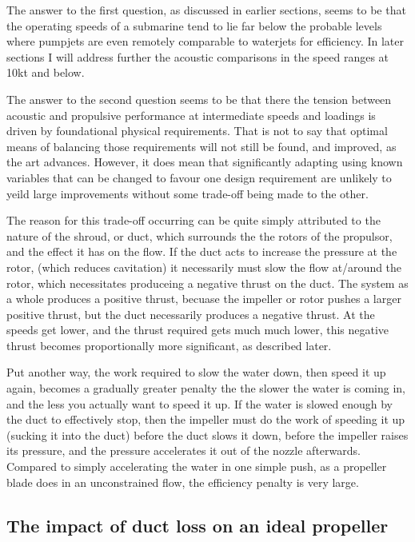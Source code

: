 \documentclass{article}\usepackage[]{graphicx}\usepackage[]{color}
\begin{document}
The answer to the first question, as discussed in earlier sections, seems to be that the operating speeds of a submarine tend to lie far below the probable levels where pumpjets are even remotely comparable to waterjets for efficiency.  In later sections I will address further the acoustic comparisons in the speed ranges at 10kt and below.

The answer to the second question seems to be that there the tension between acoustic and propulsive performance at intermediate speeds and loadings is driven by foundational physical requirements.  That is not to say that optimal means of balancing those requirements will not still be found, and improved, as the art advances.  However, it does mean that significantly adapting using known variables that can be changed to favour one design requirement are unlikely to yeild large improvements without some trade-off being made to the other.

The reason for this trade-off occurring can be quite simply attributed to the nature of the shroud, or duct, which surrounds the the rotors of the propulsor, and the effect it has on the flow. If the duct acts to increase the pressure at the rotor, (which reduces cavitation) it necessarily must slow the flow at/around the rotor, which necessitates produceing a negative thrust on the duct.  The system as a whole produces a positive thrust, becuase the impeller or rotor pushes a larger positive thrust, but the duct necessarily produces a negative thrust.  At the speeds get lower, and the thrust required gets much much lower, this negative thrust becomes proportionally more significant, as described later.

Put another way, the work required to slow the water down, then speed it up again, becomes a gradually greater penalty the the slower the water is coming in, and the less you actually want to speed it up.  If the water is slowed enough by the duct to effectively stop, then the impeller must do the work of speeding it up (sucking it into the duct) before the duct slows it down, before the impeller raises its pressure, and the pressure accelerates it out of the nozzle afterwards. Compared to simply accelerating the water in one simple push, as a propeller blade does in an unconstrained flow, the efficiency penalty is very large.

\subsection{The impact of duct loss on an ideal propeller}
\end{document}
